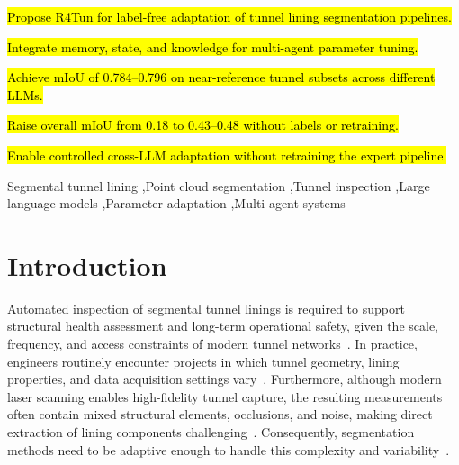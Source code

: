 \documentclass[a4paper,fleqn]{cas-dc}
\begin{document}
{%

\begin{highlights}
\item \hl{Propose R4Tun for label-free adaptation of tunnel lining segmentation pipelines.}
\item \hl{Integrate memory, state, and knowledge for multi-agent parameter tuning.}
\item \hl{Achieve mIoU of 0.784--0.796 on near-reference tunnel subsets across different LLMs.}
\item \hl{Raise overall mIoU from 0.18 to 0.43--0.48 without labels or retraining.}
\item \hl{Enable controlled cross-LLM adaptation without retraining the expert pipeline.}
\end{highlights}


\begin{keywords}
Segmental tunnel lining \sep Point cloud segmentation \sep Tunnel inspection \sep Large language models \sep Parameter adaptation \sep Multi-agent systems
\end{keywords}
\date{\today}

\maketitle
\linenumbers

\smallskip

\section{Introduction}\label{sec:intro}

Automated inspection of segmental tunnel linings is required to support structural health assessment and long-term operational safety, given the scale, frequency, and access constraints of modern tunnel networks~\cite{attard2018}. In practice, engineers routinely encounter projects in which tunnel geometry, lining properties, and data acquisition settings vary~\cite{weidner2024generalized}. Furthermore, although modern laser scanning enables high-fidelity tunnel capture, the resulting measurements often contain mixed structural elements, occlusions, and noise, making direct extraction of lining components challenging~\cite{huang2021bim,sjolander2023towards}. Consequently, segmentation methods need to be adaptive enough to handle this complexity and variability~\cite{montero2015, strauss2020sensing}.

}
\end{document}
